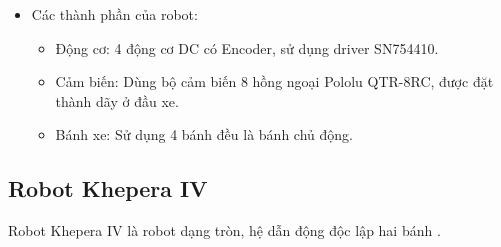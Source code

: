 \begin{itemize}
\begin{figure}[H]
            \end{figure}
            \item Các thành phần của robot:
                \begin{itemize}[label=\textendash]
                    \item Động cơ: 4 động cơ DC có Encoder, sử dụng driver SN754410.
                    \item Cảm biến: Dùng bộ cảm biến 8 hồng ngoại Pololu QTR-8RC, được đặt thành dãy ở đầu xe.
                    \item Bánh xe: Sử dụng 4 bánh đều là bánh chủ động.
                \end{itemize}
        \end{itemize}



    \subsection{Robot Khepera IV}
        \hspace*{0.6cm}Robot Khepera IV là robot dạng tròn, hệ dẫn động độc lập hai bánh \cite{khapera_IV_robot}.
